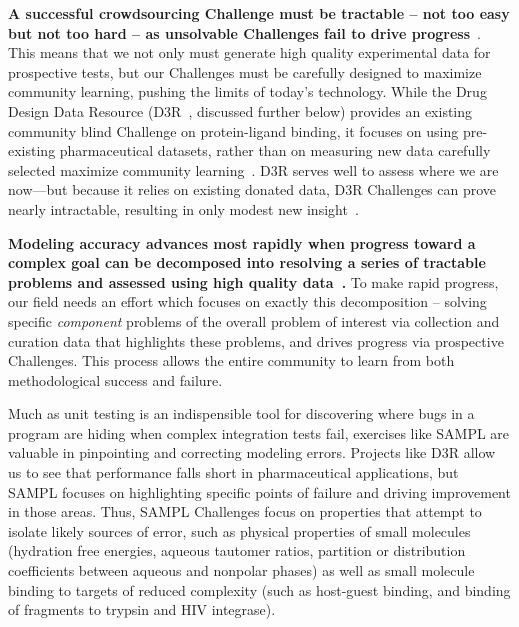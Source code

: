 \documentclass[11pt]{article}
\begin{document}
{\bf A successful crowdsourcing Challenge must be tractable -- not too easy but not too hard -- as unsolvable Challenges fail to drive progress}~\cite{Saez-Rodriguez:2016:NatRevGenet}. 
This means that we not only must generate high quality experimental data for prospective tests, but our Challenges must be carefully designed to maximize community learning, pushing the limits of today's technology.
While the Drug Design Data Resource (D3R~\cite{Gathiaka:2016:JComputAidedMolDes}, discussed further below) provides an existing community blind Challenge on protein-ligand binding, it focuses on using pre-existing pharmaceutical datasets, rather than on measuring new data carefully selected maximize community learning~\cite{Gathiaka:2016:JComputAidedMolDes}. 
D3R serves well to assess where we are now---but because it relies on existing donated data, D3R Challenges can prove nearly intractable, resulting in only modest new insight~\cite{D3R_lessons_learned}.

\textbf{Modeling accuracy advances most rapidly when progress toward a complex goal can be decomposed into resolving a series of tractable problems and assessed using high quality data~\cite{Saez-Rodriguez:2016:NatRevGenet}.}
To make rapid progress, our field needs an effort which focuses on exactly this decomposition -- solving specific \emph{component} problems of the overall problem of interest via collection and curation data that highlights these problems, and drives progress via prospective Challenges.
This process allows the entire community to learn from both methodological success and failure. 

Much as unit testing is an indispensible tool for discovering where bugs in a program are hiding when complex integration tests fail, exercises like SAMPL are valuable in pinpointing and correcting modeling errors.
Projects like D3R allow us to see that performance falls short in pharmaceutical applications, but SAMPL focuses on highlighting specific points of failure and driving improvement in those areas. 
Thus, SAMPL Challenges focus on properties that attempt to isolate likely sources of error, such as physical properties of small molecules (hydration free energies, aqueous tautomer ratios, partition or distribution coefficients between aqueous and nonpolar phases) as well as small molecule binding to targets of reduced complexity (such as host-guest binding, and binding of fragments to trypsin and HIV integrase).
\end{document}
